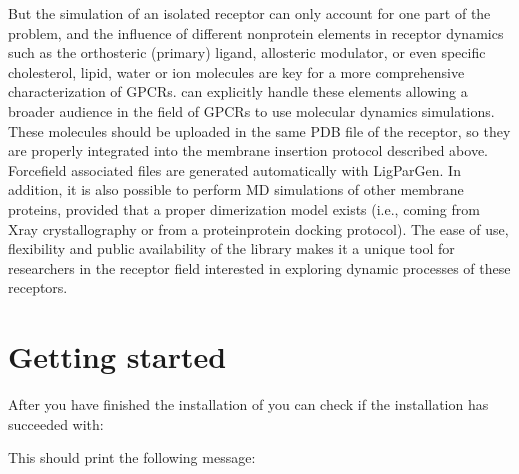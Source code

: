 \documentclass[letterpaper,10pt,english]{sphinxmanual}
\begin{document}
\sphinxAtStartPar
But the simulation of an isolated receptor can only account for one part
of the problem, and the influence of different non\sphinxhyphen{}protein elements in
receptor dynamics such as the orthosteric (primary) ligand, allosteric
modulator, or even specific cholesterol, lipid, water or ion molecules
are key for a more comprehensive characterization of GPCRs. 
can explicitly handle these elements allowing a broader audience in the
field of GPCRs to use molecular dynamics simulations. These molecules
should be uploaded in the same PDB file of the receptor, so they are
properly integrated into the membrane insertion protocol described above.
Force\sphinxhyphen{}field associated files are generated automatically with LigParGen.
In addition, it is also possible to perform MD simulations of other
membrane proteins, provided that a proper dimerization model exists (i.e.,
coming from X\sphinxhyphen{}ray crystallography or from a protein\sphinxhyphen{}protein docking
protocol). The ease of use, flexibility and public availability of the
 library makes it a unique tool for researchers in the
receptor field interested in exploring dynamic processes of these receptors.


\section{Getting started}
\label{\detokenize{manual:getting-started}}
\sphinxAtStartPar
After you have finished the installation of  you can check
if the installation has succeeded with:

\begin{sphinxVerbatim}[commandchars=\\\{\}]
 
\end{sphinxVerbatim}

\sphinxAtStartPar
This should print the following message:
\end{document}
